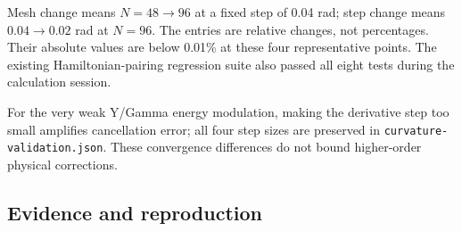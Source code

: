 Mesh change means \(N=48\to96\) at a fixed step of 0.04 rad; step change
means \(0.04\to0.02\) rad at \(N=96\). The entries are relative changes,
not percentages. Their absolute values are below 0.01\% at these four
representative points. The existing Hamiltonian-pairing regression suite
also passed all eight tests during the calculation session.

For the very weak Y/Gamma energy modulation, making the derivative step
too small amplifies cancellation error; all four step sizes are
preserved in {\small\texttt{\nolinkurl{curvature-validation.json}}}.
These convergence differences do not bound higher-order physical
corrections.

\subsection{Evidence and reproduction}\label{evidence-and-reproduction}

